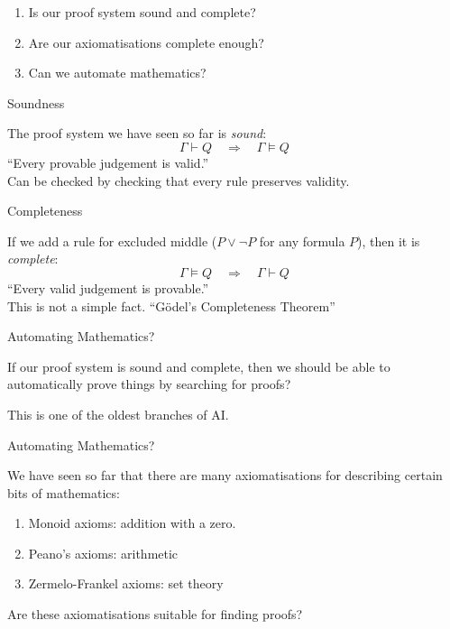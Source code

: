 \documentclass[xetex,aspectratio=169,14pt,hyperref={pdfpagelabels=true,pdflang={en-GB}}]{beamer}
\begin{document}
\frame{\titlepage}


\begin{frame}
  \begin{enumerate}
  \item Is our proof system sound and complete?
  \item Are our axiomatisations complete enough?
  \item Can we automate mathematics?
  \end{enumerate}
\end{frame}

\begin{frame}
  {Soundness}

  The proof system we have seen so far is \emph{sound}:
  \begin{displaymath}
    \Gamma \vdash Q \quad \Rightarrow \quad \Gamma \models Q
  \end{displaymath}
  \textcolor{black!60}{``Every provable judgement is valid.''}\\
  \textcolor{black!60}{Can be checked by checking that every rule preserves validity.}
\end{frame}

\begin{frame}
  {Completeness}

  If we add a rule for excluded middle ($P \lor \lnot P$ for any formula $P$), then it is \emph{complete}:
  \begin{displaymath}
    \Gamma \models Q \quad \Rightarrow \quad \Gamma \vdash Q
  \end{displaymath}
  \textcolor{black!60}{``Every valid judgement is provable.''}\\
  \textcolor{black!60}{This is not a simple fact. ``G{\"o}del's Completeness Theorem''}
\end{frame}

\begin{frame}
  {Automating Mathematics?}

  If our proof system is sound and complete, then we should be able to
  automatically prove things by searching for proofs?

  \bigskip

  This is one of the oldest branches of AI.
\end{frame}

\begin{frame}
  {Automating Mathematics?}

  We have seen so far that there are many axiomatisations for
  describing certain bits of mathematics:
  \begin{enumerate}
  \item Monoid axioms: addition with a zero.
  \item Peano's axioms: arithmetic
  \item Zermelo-Frankel axioms: set theory
  \end{enumerate}

  \bigskip

  Are these axiomatisations suitable for finding proofs?
\end{frame}
\end{document}
